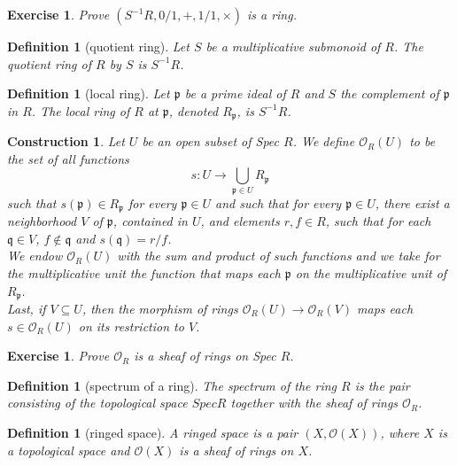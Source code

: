 \documentclass[12pt]{article}
\newtheorem{definition}[proposition]{Definition}
\newtheorem{ex}[proposition]{Exercise}
\newtheorem{cons}[proposition]{Construction}
\begin{document}
\begin{ex}
	Prove $(S^{-1} R, 0/1, +, 1/1, \times)$ is a ring.
\end{ex}		

\begin{definition}[quotient ring]
	Let $S$ be a multiplicative submonoid of $R$. The quotient ring of $R$ by $S$ is $S^{-1} R$. 
\end{definition}

\begin{definition}[local ring]
Let $\mathfrak{p}$ be a prime ideal of $R$ and $S$ the complement of $\mathfrak{p}$ in $R$. The local ring of $R$ at $\mathfrak{p}$, denoted $R_{\mathfrak{p}}$, is $S^{-1} R$. 	
\end{definition}

\begin{cons}
	Let $U$ be an open subset of Spec $R$. We define $\mathscr{O}_R(U)$ to be the set of all functions 
	\[
	s: U \rightarrow \bigcup \limits_{\mathfrak{p} \in U} R_{\mathfrak{p}}
	\]
	such that $s(\mathfrak{p}) \in R_{\mathfrak{p}}$ for every $\mathfrak{p} \in U$ and such that for every $\mathfrak{p} \in U$, there exist a neighborhood $V$ of $\mathfrak{p}$, contained in $U$, and elements $r, f \in R$, such that for each $\mathfrak{q} \in V$, $f \notin \mathfrak{q}$ and $s(\mathfrak{q}) = r/f$. \\
	We endow $\mathscr{O}_R(U)$ with the sum and product of such functions and we take for the multiplicative unit the function that maps each $\mathfrak{p}$ on the multiplicative unit of $R_{\mathfrak{p}}$. \\
	Last, if $V \subseteq U$, then the morphism of rings $\mathscr{O}_R(U) \rightarrow \mathscr{O}_R(V)$ maps each $s \in \mathscr{O}_R(U)$ on its restriction to $V$. 
\end{cons}

\begin{ex}
	Prove $\mathscr{O}_R$ is a sheaf of rings on Spec $R$. 
\end{ex}			

\begin{definition}[spectrum of a ring]
	The spectrum of the ring $R$ is the pair consisting of the topological space $Spec R$ together with the sheaf of rings $\mathscr{O}_R$.
\end{definition}

\begin{definition}[ringed space]
	A ringed space is a pair $(X, \mathscr{O}(X))$, where $X$ is a topological space and $\mathscr{O}(X)$ is a sheaf of rings on $X$.
\end{definition}
\end{document}
